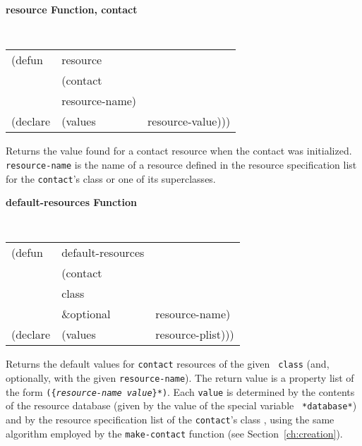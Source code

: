 \documentclass[twoside]{book}
\begin{document}
\begin{sloppy}
{\samepage
{\large {\bf resource \hfill Function, contact}}
\begin{flushright} \parbox[t]{6.125in}{
\tt
\begin{tabular}{lll}
\raggedright
(defun & resource & \\
& (contact\\
& resource-name) \\
(declare &(values &resource-value)))
\end{tabular}
\rm

}\end{flushright}}

\begin{flushright} \parbox[t]{6.125in}{
Returns the value found for a contact resource when the contact was initialized.
{\tt resource-name} is the name of a resource defined in the resource
specification list for the {\tt contact}'s class or one of its superclasses.

}\end{flushright}

{\samepage
{\large {\bf default-resources \hfill Function}} 
\begin{flushright} \parbox[t]{6.125in}{
\tt
\begin{tabular}{lll}
\raggedright
(defun & default-resources & \\ 
& (contact\\
& class \\
& \&optional & resource-name) \\
(declare &(values  & resource-plist)))
\end{tabular}
\rm

}\end{flushright}}

\begin{flushright} \parbox[t]{6.125in}{
Returns the default values for {\tt contact} resources  of the given {\tt
class} (and, optionally, with the given {\tt resource-name}). The return value is a
property list of the form {\tt (\{{\em resource-name value}\}*)}. Each {\tt value}
is determined by the contents of the resource database (given by the value of the special variable {\tt
*database*}) and by the resource specification list of the {\tt contact}'s class
, using  the same algorithm employed by the {\tt make-contact}
function
(see Section~\ref{ch:creation}).

}
\end{flushright}
\end{sloppy}
\end{document}
